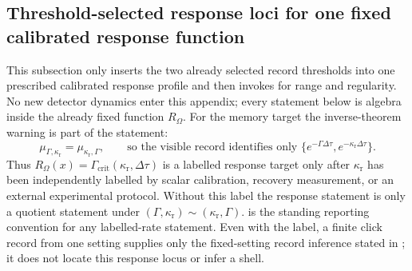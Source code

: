 \subsection{Threshold-selected response loci for one fixed calibrated response function}

This subsection only inserts the two already selected record thresholds into
one prescribed calibrated response profile and then invokes
 for range and regularity.  No new detector
dynamics enter this appendix; every statement below is algebra inside the
already fixed function $R_\Omega$.  For the memory target the inverse-theorem
warning is part of the statement:
\[
\mu_{\Gamma,\kappa_{\mathrm r}}=\mu_{\kappa_{\mathrm r},\Gamma},
\qquad
\text{so the visible record identifies only }
\{e^{-\Gamma\Delta\tau},e^{-\kappa_{\mathrm r}\Delta\tau}\}.
\]
Thus \(R_\Omega(x)=\Gamma_{\mathrm{crit}}(\kappa_{\mathrm r},\Delta\tau)\) is a labelled
response target only after \(\kappa_{\mathrm r}\) has been independently
labelled by scalar calibration, recovery measurement, or an
external experimental protocol.  Without this label the response statement is
only a quotient statement under
\((\Gamma,\kappa_{\mathrm r})\sim(\kappa_{\mathrm r},\Gamma)\).
 is the standing reporting
convention for any labelled-rate statement.
Even with the label, a finite click record from one setting supplies only the
fixed-setting record inference stated in ;
it does not locate this response locus or infer a shell.


